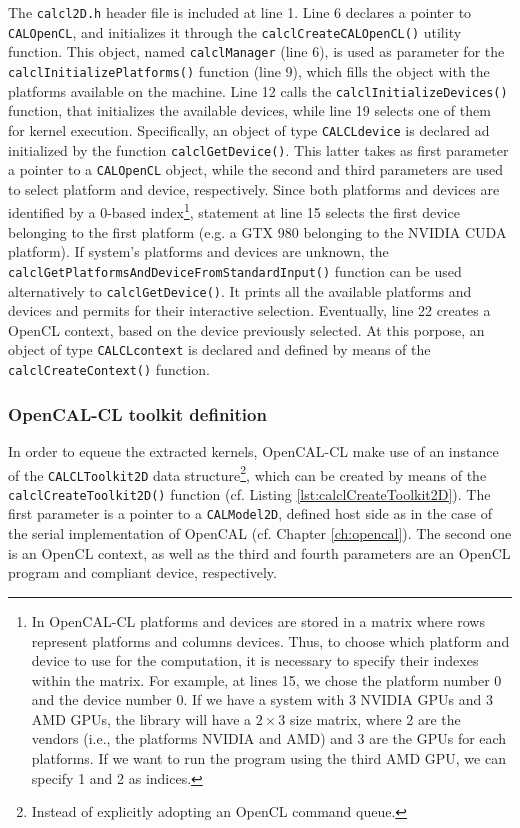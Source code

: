 The \verb'calcl2D.h' header file is included at line 1. Line 6
declares a pointer to \verb'CALOpenCL', and initializes it through the
\verb'calclCreateCALOpenCL()' utility function. This object, named
\verb'calclManager' (line 6), is used as parameter for the
\verb'calclInitializePlatforms()' function (line 9), which fills the
object with the platforms available on the machine. Line 12 calls the
\verb'calclInitializeDevices()' function, that initializes the
available devices, while line 19 selects one of them for kernel
execution. Specifically, an object of type \verb'CALCLdevice' is
declared ad initialized by the function \verb'calclGetDevice()'. This
latter takes as first parameter a pointer to a \verb'CALOpenCL'
object, while the second and third parameters are used to select
platform and device, respectively. Since both platforms and devices
are identified by a 0-based index\footnote{In OpenCAL-CL platforms and
  devices are stored in a matrix where rows represent platforms and
  columns devices. Thus, to choose which platform and device to use
  for the computation, it is necessary to specify their indexes within
  the matrix. For example, at lines 15, we chose the platform number 0
  and the device number 0. If we have a system with 3 NVIDIA GPUs and
  3 AMD GPUs, the library will have a $2 \times 3$ size matrix, where
  2 are the vendors (i.e., the platforms NVIDIA and AMD) and 3 are the
  GPUs for each platforms. If we want to run the program using the
  third AMD GPU, we can specify 1 and 2 as indices.}, statement at
line 15 selects the first device belonging to the first platform
(e.g. a GTX 980 belonging to the NVIDIA CUDA platform). If system's
platforms and devices are unknown, the
\verb'calclGetPlatformsAndDeviceFromStandardInput()' function can be
used alternatively to \verb'calclGetDevice()'. It prints all the
available platforms and devices and permits for their interactive
selection. Eventually, line 22 creates a OpenCL context, based on the
device previously selected. At this porpose, an object of type
\verb'CALCLcontext' is declared and defined by means of the
\verb'calclCreateContext()' function.


\subsubsection{OpenCAL-CL toolkit definition}

In order to equeue the extracted kernels, OpenCAL-CL make use of an
instance of the \verb'CALCLToolkit2D' data structure\footnote{Instead
  of explicitly adopting an OpenCL command queue.}, which can be
created by means of the \verb'calclCreateToolkit2D()' function
(cf. Listing \ref{lst:calclCreateToolkit2D}). The first parameter is a
pointer to a \verb'CALModel2D', defined host side as in the case of the
serial implementation of OpenCAL (cf. Chapter \ref{ch:opencal}). The
second one is an OpenCL context, as well as the third and fourth
parameters are an OpenCL program and compliant device, respectively.

